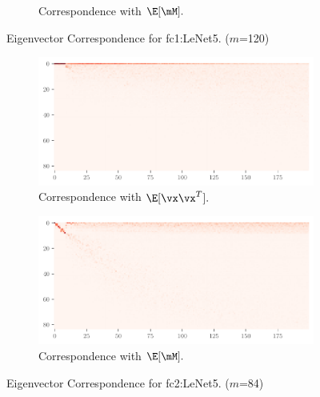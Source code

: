 \begin{figure}[H]
\begin{subfigure}[t]{0.5\textwidth}
        \caption{Correspondence with $\E[\mM].$}
        \label{fig:Corr_UTAU_True_fc1}
    \end{subfigure}
    \caption{Eigenvector Correspondence for fc1:LeNet5. ($m$=120)}
    \label{fig:Corrfc11}
\end{figure}

\begin{figure}[H]
    \centering
    \begin{subfigure}[t]{0.5\textwidth}
        \centering
        \captionsetup{justification=centering}
        \includegraphics[width=\textwidth]{Figures/Correspondence/LeNet5_fixlr0.01/xxT_Trueest_real_corr_expand_t200_CIFAR10_Exp1_LeNet5_fixlr0.01R2_E-1_fc2.pdf}
        \caption{Correspondence with $\E[\vx\vx^T].$}
        \label{fig:Corr_xxT_True_fc2}
    \end{subfigure}%
    \begin{subfigure}[t]{0.5\textwidth}
        \centering
        \captionsetup{justification=centering}
        \includegraphics[width=\textwidth]{Figures/Correspondence/LeNet5_fixlr0.01/UTAU_Trueest_real_corr_expand_t200_CIFAR10_Exp1_LeNet5_fixlr0.01R2_E-1_fc2.pdf}
        \caption{Correspondence with $\E[\mM].$}
        \label{fig:Corr_UTAU_True_fc2}
    \end{subfigure}
    \caption{Eigenvector Correspondence for fc2:LeNet5. ($m$=84)}
    \label{fig:Corrfc22}
\end{figure}

